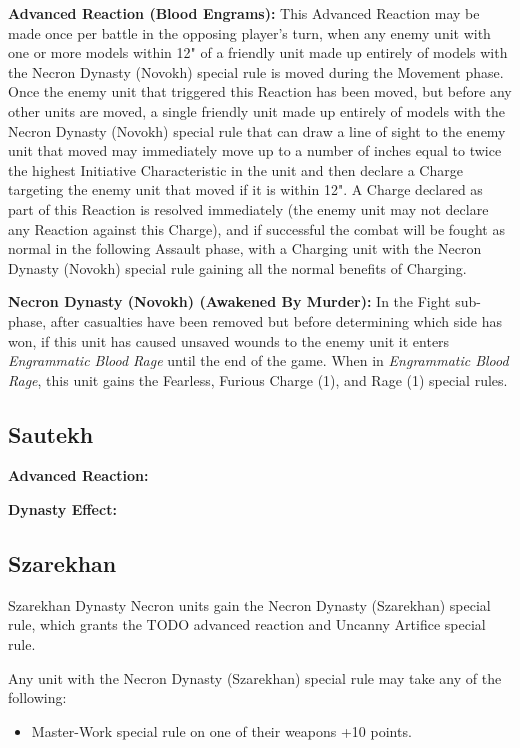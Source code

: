 \textbf{Advanced Reaction (Blood Engrams):} This Advanced Reaction may be made once per battle in the opposing player’s turn, when any enemy unit with one or more models within 12" of a friendly unit made up entirely of models with the Necron Dynasty (Novokh) special rule is moved during the Movement phase. Once the enemy unit that triggered this Reaction has been moved, but before any other units are moved, a single friendly unit made up entirely of models with the Necron Dynasty (Novokh) special rule that can draw a line of sight to the enemy unit that moved may immediately move up to a number of inches equal to twice the highest Initiative Characteristic in the unit and then declare a Charge targeting the enemy unit that moved if it is within 12". A Charge declared as part of this Reaction is resolved immediately (the enemy unit may not declare any Reaction against this Charge), and if successful the combat will be fought as normal in the following Assault phase, with a Charging unit with the Necron Dynasty (Novokh) special rule gaining all the normal benefits of Charging.

\textbf{Necron Dynasty (Novokh) (Awakened By Murder):} In the Fight sub-phase, after casualties have been removed but before determining which side has won, if this unit has caused unsaved wounds to the enemy unit it enters \textit{Engrammatic Blood Rage} until the end of the game. When in \textit{Engrammatic Blood Rage}, this unit gains the Fearless, Furious Charge (1), and Rage (1) special rules.

\subsection{Sautekh}

\textbf{Advanced Reaction:}

\textbf{Dynasty Effect:}


\subsection{Szarekhan}

Szarekhan Dynasty Necron units gain the Necron Dynasty (Szarekhan) special rule, which grants the TODO advanced reaction and Uncanny Artifice special rule.

Any unit with the Necron Dynasty (Szarekhan) special rule may take any of the following:
\begin{itemize}
	\item Master-Work special rule on one of their weapons \dotfill +10 points.
\end{itemize}

